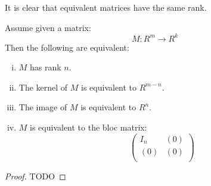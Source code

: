 It is clear that equivalent matrices have the same rank.

\begin{lemma}\label{rank-equivalent-definitions}
Assume given a matrix:
\[M : R^m\to R^k\]
Then the following are equivalent:
\begin{enumerate}[(i)]
\item $M$ has rank $n$.
\item The kernel of $M$ is equivalent to $R^{m-n}$.
\item The image of $M$ is equivalent to $R^n$.
\item $M$ is equivalent to the bloc matrix:
\[\begin{pmatrix}
I_n & (0)  \\
(0) & (0) \\
\end{pmatrix}\]
\end{enumerate}
\end{lemma}

\begin{proof}
TODO
\end{proof}





